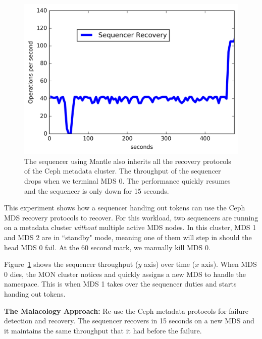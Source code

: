 \documentclass[preprint]{sigplanconf-eurosys}
\begin{document}
\begin{figure}[t]
\centering
\includegraphics{figures/recovery-seq-thruput.png}
\caption{The sequencer using Mantle also inherits all the recovery protocols of
the Ceph metadata cluster. The throughput of the sequencer drops when we
terminal MDS 0. The performance quickly resumes and the sequencer is only down
for 15 seconds.}
\label{fig:recovery-seq-thruput}
\end{figure}

This experiment shows how a sequencer handing out tokens can use the Ceph MDS
recovery protocols to recover. For this workload, two sequencers are running on
a metadata cluster {\it without} multiple active MDS nodes. In this cluster,
MDS 1 and MDS 2 are in ``standby" mode, meaning one of them will step in should
the head MDS 0 fail. At the 60 second mark, we manually kill MDS 0. 

Figure~\ref{fig:recovery-seq-thruput} shows the sequencer throughput (\(y\)
axis) over time (\(x\) axis). When MDS 0 dies, the MON cluster notices and
quickly assigns a new MDS to handle the namespace. This is when MDS 1 takes
over the sequencer duties and starts handing out tokens.

\textbf{The Malacology Approach:} Re-use the Ceph metadata protocols for
failure detection and recovery. The sequencer recovers in 15 seconds on a new
MDS and it maintains the same throughput that it had before the failure.

%
%
%
\end{document}

